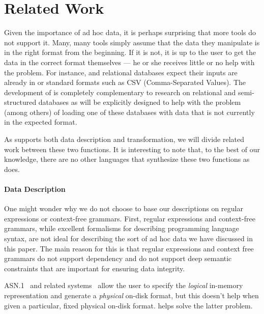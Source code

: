 \section{Related Work}
\label{sec:related-work}

Given the importance of ad hoc data, it is perhaps surprising that
more tools do not support it.  Many, many tools simply assume that the
data they manipulate is in the right format from the beginning.  If it
is not, it is up to the user to get the data in the correct format
themselves --- he or she receives little or no help with the problem.
For instance, \xml{} and relational databases expect their inputs are
already in \xml{} or standard formats such as CSV (Comma-Separated
Values).  The development of \datatype{} is completely complementary
to research on relational and semi-structured databases as \datatype
will be explicitly designed to help with the problem (among others) of
loading one of these databases with data that is not currently in the
expected format.

As \datatype{} supports both data description and transformation, we
will divide related work between these two functions. It is
interesting to note that, to the best of our knowledge, there are no
other languages that synthesize these two functions as \datatype{}
does.

\paragraph{Data Description}

One might wonder why we do not choose to base our descriptions on
regular expressions or context-free grammars. First, regular
expressions and context-free grammars, while excellent formalisms for
describing programming language syntax, are not ideal for describing
the sort of ad hoc data we have discussed in this paper.  The main
reason for this is that regular expressions and context free grammars
do not support dependency and do not support deep semantic constraints
that are important for ensuring data integrity.

ASN.1~\cite{asn} and related systems~\cite{asdl} allow the user to
specify the {\em logical} in-memory representation and generate a {\em
  physical} on-disk format, but this doesn't help when given a
particular, fixed physical on-disk format.  \datatype{} helps solve
the latter problem.

